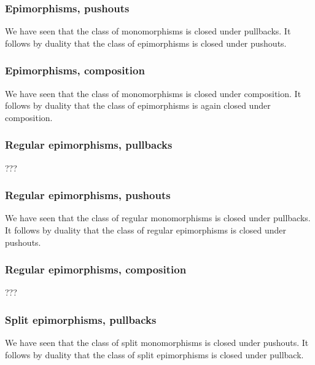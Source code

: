 \subsubsection*{Epimorphisms, pushouts}

We have seen that the class of monomorphisms is closed under pullbacks.
It follows by duality that the class of epimorphisms is closed under pushouts.



\subsubsection*{Epimorphisms, composition}

We have seen that the class of monomorphisms is closed under composition.
It follows by duality that the class of epimorphisms is again closed under composition.



\subsubsection*{Regular epimorphisms, pullbacks}

???



\subsubsection*{Regular epimorphisms, pushouts}

We have seen that the class of regular monomorphisms is closed under pullbacks.
It follows by duality that the class of regular epimorphisms is closed under pushouts.



\subsubsection*{Regular epimorphisms, composition}

???



\subsubsection*{Split epimorphisms, pullbacks}

We have seen that the class of split monomorphisms is closed under pushouts.
It follows by duality that the class of split epimorphisms is closed under pullback.



